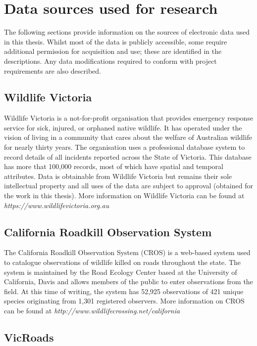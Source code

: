 \chapter{Data sources used for research}\label{apx:C}
\newpage

The following sections provide information on the sources of electronic data used in this thesis. Whilst most of the data is publicly accessible, some require additional permission for acquisition and use; these are identified in the descriptions. Any data modifications required to conform with project requirements are also described.

\section{Wildlife Victoria}

Wildlife Victoria is a not-for-profit organisation that provides emergency response service for sick, injured, or orphaned native wildlife. It has operated under the vision of living in a community that cares about the welfare of Australian wildlife for nearly thirty years. The organisation uses a professional database system to record details of all incidents reported across the State of Victoria. This database has more that 100,000 records, most of which have spatial and temporal attributes. Data is obtainable from Wildlife Victoria but remains their sole intellectual property and all uses of the data are subject to approval (obtained for the work in this thesis). More information on Wildlife Victoria can be found at \textit{https://www.wildlifevictoria.org.au}

\section{California Roadkill Observation System}

The California Roadkill Observation System (CROS) is a web-based system used to catalogue observations of wildlife killed on roads throughout the state. The system is maintained by the Road Ecology Center based at the University of California, Davis and allows members of the public to enter observations from the field. At this time of writing, the system has 52,925 observations of 421 unique species originating from 1,301 registered observers. More information on CROS can be found at \textit{http://www.wildlifecrossing.net/california}

\section{VicRoads}

